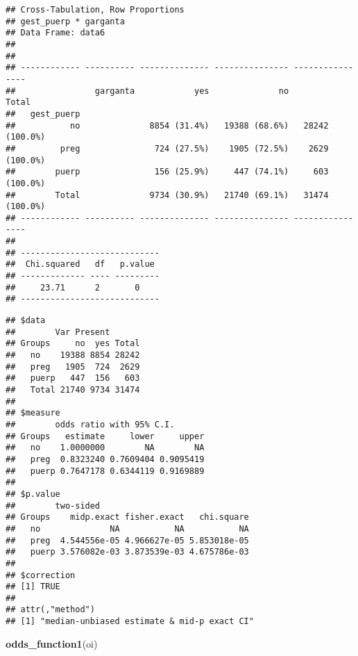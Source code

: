\documentclass[
]{article}
\newenvironment{Shaded}{\begin{snugshade}}{\end{snugshade}}
\newcommand{\KeywordTok}[1]{\textcolor[rgb]{0.13,0.29,0.53}{\textbf{#1}}}
\newcommand{\NormalTok}[1]{#1}
\newcommand{\OperatorTok}[1]{\textcolor[rgb]{0.81,0.36,0.00}{\textbf{#1}}}
\newcommand{\StringTok}[1]{\textcolor[rgb]{0.31,0.60,0.02}{#1}}
\begin{document}
\begin{verbatim}
## Cross-Tabulation, Row Proportions  
## gest_puerp * garganta  
## Data Frame: data6  
## 
## 
## ------------ ---------- -------------- --------------- ----------------
##                garganta            yes              no            Total
##   gest_puerp                                                           
##           no              8854 (31.4%)   19388 (68.6%)   28242 (100.0%)
##         preg               724 (27.5%)    1905 (72.5%)    2629 (100.0%)
##        puerp               156 (25.9%)     447 (74.1%)     603 (100.0%)
##        Total              9734 (30.9%)   21740 (69.1%)   31474 (100.0%)
## ------------ ---------- -------------- --------------- ----------------
## 
## ----------------------------
##  Chi.squared   df   p.value 
## ------------- ---- ---------
##     23.71      2       0    
## ----------------------------
\end{verbatim}

\begin{Shaded}
\end{Shaded}

\begin{verbatim}
## $data
##        Var Present
## Groups     no  yes Total
##   no    19388 8854 28242
##   preg   1905  724  2629
##   puerp   447  156   603
##   Total 21740 9734 31474
## 
## $measure
##        odds ratio with 95% C.I.
## Groups   estimate     lower     upper
##   no    1.0000000        NA        NA
##   preg  0.8323240 0.7609404 0.9095419
##   puerp 0.7647178 0.6344119 0.9169889
## 
## $p.value
##        two-sided
## Groups    midp.exact fisher.exact   chi.square
##   no              NA           NA           NA
##   preg  4.544556e-05 4.966627e-05 5.853018e-05
##   puerp 3.576082e-03 3.873539e-03 4.675786e-03
## 
## $correction
## [1] TRUE
## 
## attr(,"method")
## [1] "median-unbiased estimate & mid-p exact CI"
\end{verbatim}

\begin{Shaded}
\begin{Highlighting}[]
\KeywordTok{odds_function1}\NormalTok{(oi)}
\end{Highlighting}
\end{Shaded}
\end{document}
